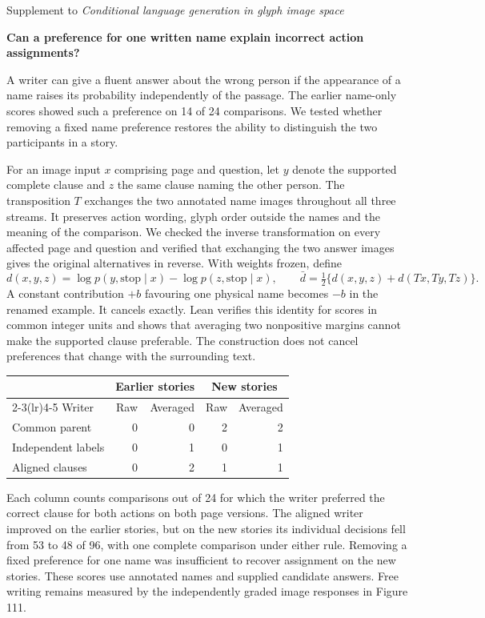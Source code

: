 \documentclass[11pt]{article}
\begin{document}
{\small Supplement to \emph{Conditional language generation in glyph image space}}\par
{\Large\bfseries Can a preference for one written name explain incorrect action assignments?}\par
A writer can give a fluent answer about the wrong person if the appearance of a name raises its probability independently of the passage. The earlier name-only scores showed such a preference on 14 of 24 comparisons. We tested whether removing a fixed name preference restores the ability to distinguish the two participants in a story.

For an image input $x$ comprising page and question, let $y$ denote the supported complete clause and $z$ the same clause naming the other person. The transposition $T$ exchanges the two annotated name images throughout all three streams. It preserves action wording, glyph order outside the names and the meaning of the comparison. We checked the inverse transformation on every affected page and question and verified that exchanging the two answer images gives the original alternatives in reverse. With weights frozen, define
\[
 d(x,y,z)=\log p(y,\mathrm{stop}\mid x)-\log p(z,\mathrm{stop}\mid x),\qquad
 \bar d=\tfrac12\{d(x,y,z)+d(Tx,Ty,Tz)\}.
\]
A constant contribution $+b$ favouring one physical name becomes $-b$ in the renamed example. It cancels exactly. Lean verifies this identity for scores in common integer units and shows that averaging two nonpositive margins cannot make the supported clause preferable. The construction does not cancel preferences that change with the surrounding text.

\begin{center}
\begin{tabular}{lrrrr}
\toprule
 & \multicolumn{2}{c}{Earlier stories} & \multicolumn{2}{c}{New stories}\\
\cmidrule(lr){2-3}\cmidrule(lr){4-5}
Writer & Raw & Averaged & Raw & Averaged\\
\midrule
Common parent & 0 & 0 & 2 & 2\\
Independent labels & 0 & 1 & 0 & 1\\
Aligned clauses & 0 & 2 & 1 & 1\\
\bottomrule
\end{tabular}
\end{center}
Each column counts comparisons out of 24 for which the writer preferred the correct clause for both actions on both page versions. The aligned writer improved on the earlier stories, but on the new stories its individual decisions fell from 53 to 48 of 96, with one complete comparison under either rule. Removing a fixed preference for one name was insufficient to recover assignment on the new stories. These scores use annotated names and supplied candidate answers. Free writing remains measured by the independently graded image responses in Figure 111.
\end{document}
